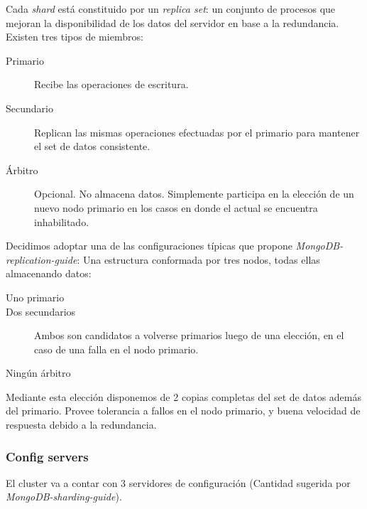 Cada \emph{shard} está constituido por un \emph{replica set}: un conjunto de procesos que mejoran la 
disponibilidad de los datos del
servidor en base a la redundancia. Existen tres tipos de miembros:

\begin{description}
	\item[Primario] Recibe las operaciones de escritura.
	\item[Secundario] Replican las mismas operaciones efectuadas por el primario para mantener el set de datos consistente.
	\item[Árbitro] Opcional. 
	No almacena datos. Simplemente participa en la elección de un nuevo nodo primario en los casos en donde el actual se
	encuentra inhabilitado.
\end{description}

Decidimos adoptar una de las configuraciones típicas que propone \emph{MongoDB-replication-guide}: 
Una estructura conformada por tres nodos, todas ellas almacenando datos: 

\begin{description}
	\item[Uno primario] 
	\item[Dos secundarios] Ambos son candidatos a volverse primarios luego de una elección, en el caso de una falla
	en el nodo primario.
	\item[Ningún árbitro]
\end{description}

Mediante esta elección disponemos de 2 copias completas del set de datos además del primario. Provee tolerancia a fallos
en el nodo primario, y buena velocidad de respuesta debido a la redundancia.

\subsubsection{Config servers}

El cluster va a contar con 3 servidores de configuración (Cantidad sugerida por \emph{MongoDB-sharding-guide}).














